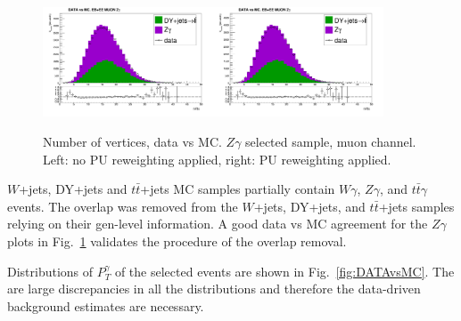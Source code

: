 \begin{figure}[htb]
  \begin{center}
   \includegraphics[width=0.45\textwidth]{../figs/figs_v11/MUON_ZGamma/PrepareYields/c_TotalDATAvsMC_EtaCommon__nVtx_noPU.png}\includegraphics[width=0.45\textwidth]{../figs/figs_v11/MUON_ZGamma/PrepareYields/c_TotalDATAvsMC_EtaCommon__nVtx.png}
  \caption{Number of vertices, data vs MC. $Z\gamma$ selected sample, muon channel. Left: no PU reweighting applied, right: PU reweighting applied. }
  \label{fig:DATAvsMC_nVtx}
  \end{center}
\end{figure}

$W$+jets, DY+jets and $t\bar{t}$+jets MC samples partially contain $W\gamma$, $Z\gamma$, and $t\bar{t}\gamma$ events. The overlap was removed from the $W$+jets, DY+jets, and $t\bar{t}$+jets samples relying on their gen-level information. A good data vs MC agreement for the $Z\gamma$ plots in Fig.~\ref{fig:DATAvsMC_nVtx} validates the procedure of the overlap removal.

Distributions of $P_T^{\gamma}$ of the selected events are shown in Fig.~\ref{fig:DATAvsMC}. The are large discrepancies in all the distributions and therefore the data-driven background estimates are necessary.

